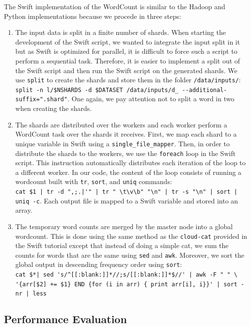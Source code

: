 \documentclass{article}
\begin{document}
The Swift implementation of the WordCount is similar to the Hadoop and Python implementations because we procede in three steps:

\begin{enumerate}
  \item The input data is split in a finite number of shards. When starting the development of the Swift script, we wanted to integrate the input split in it but as Swift is optimized for parallel, it is difficult to force such a script to perform a sequential task. Therefore, it is easier to implement a split out of the Swift script and then run the Swift script on the generated shards. We use \lstinline|split| to create the shards and store them in the folder \lstinline|/data/inputs/|:\\
  \lstinline|split -n l/$NSHARDS -d $DATASET /data/inputs/d_ --additional-suffix=".shard"|. One again, we pay attention not to split a word in two when creating the shards.
  \item The shards are distributed over the workers and each worker perform a WordCount task over the shards it receives. First, we map each shard to a unique variable in Swift using a \lstinline|single_file_mapper|. Then, in order to distribute the shards to the workers, we use the \lstinline|foreach| loop in the Swift script. This instruction automatically distributes each iteration of the loop to a different worker. In our code, the content of the loop consists of running a wordcount built with \lstinline|tr|, \lstinline|sort|, and \lstinline|uniq| commands:\\
  \lstinline£cat $1 | tr -d ",;.|'" | tr " \t\v\b" "\n" | tr -s "\n" | sort | uniq -c£. Each output file is mapped to a Swift variable and stored into an array.
  \item The temporary word counts are merged by the master node into a global wordcount. This is done using the same method as the \lstinline|cloud-cat| provided in the Swift tutorial except that instead of doing a simple cat, we sum the counts for words that are the same using \lstinline|sed| and \lstinline|awk|. Moreover, we sort the global output in descending frequency order using \lstinline|sort|:\\
  \lstinline£cat $*| sed 's/^[[:blank:]]*//;s/[[:blank:]]*$//' | awk -F " " \ £\\
  \lstinline£'{arr[$2] += $1} END {for (i in arr) { print arr[i], i}}' | sort -nr | less£
\end{enumerate}

\subsection{Performance Evaluation}
\end{document}

